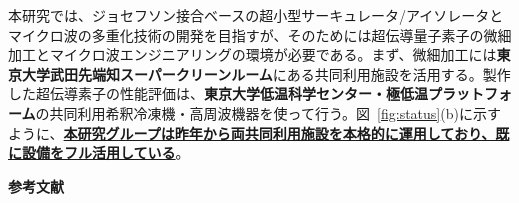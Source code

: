 \documentclass[11pt,a4j,dvipdfmx]{jarticle} 					%
\newcommand{\研究課題名}{誤り耐性量子コンピュータに向けた誤り訂正技術の開発(仮)}
\newcommand{\研究機関名}{東京大学}
\newcommand{\研究代表者氏名}{寺師弘二}
\newcommand{\研究期間の最終元号年度}{10}  %
\newcommand{\mybf}[1]{{\bfseries\sffamily#1}}
\begin{document}
本研究では、ジョセフソン接合ベースの超小型サーキュレータ/アイソレータとマイクロ波の多重化技術の開発を目指すが、そのためには超伝導量子素子の微細加工とマイクロ波エンジニアリングの環境が必要である。まず、微細加工には\mybf{東京大学武田先端知スーパークリーンルーム}にある共同利用施設を活用する。製作した超伝導素子の性能評価は、\mybf{東京大学低温科学センター・極低温プラットフォーム}の共同利用希釈冷凍機・高周波機器を使って行う。図~\ref{fig:status}(b)に示すように、\mybf{\ul{本研究グループは昨年から両共同利用施設を本格的に運用しており、既に設備をフル活用している}}。


\vspace*{1zw}
\noindent\textbf{参考文献} \vspace{-2mm}
\end{document}
